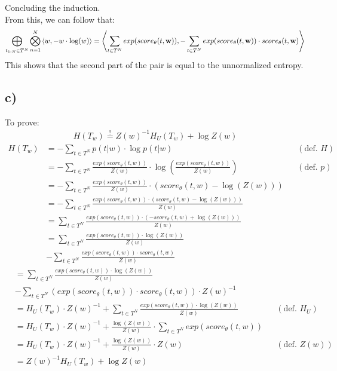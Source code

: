 \documentclass[a4paper,12pt]{ETHexercise}
\begin{document}
Concluding the induction.\\
From this, we can follow that:
\begin{align*}
    \bigoplus_{t_{1:N} \in T^N} \bigotimes_{n=1}^N \left\langle w, -w \cdot \log(w)\right\rangle = \left\langle\sum_{t \in T^N} exp(score_\theta(t,\textbf{w})), -\sum_{t \in T^N} exp(score_\theta(t,\textbf{w})) \cdot score_\theta(t,\textbf{w})\right\rangle
\end{align*}
This shows that the second part of the pair is equal to the unnormalized entropy. 
\subsection*{c)}
To prove:
\begin{align}
    H(T_w) \stackrel{!}{=} Z(w)^{-1}H_{U}(T_w)+\log Z(w)
\end{align}
\begin{align}
    H(T_w) &= - \sum_{t\in T^N}p(t|w) \cdot \log p(t|w) &&(\text{def. } H)\\
    &= - \sum_{t\in T^N}\frac{exp(score_\theta(t,w))}{Z(w)} \cdot \log(\frac{exp(score_\theta(t,w))}{Z(w)}) &&(\text{def. } p)\\
    &= - \sum_{t\in T^N}\frac{exp(score_\theta(t,w))}{Z(w)} \cdot (score_\theta(t,w) - \log(Z(w))) \\
    &= - \sum_{t\in T^N}\frac{exp(score_\theta(t,w))\cdot (score_\theta(t,w) - \log(Z(w)))}{Z(w)}\\
    &= \sum_{t\in T^N}\frac{exp(score_\theta(t,w))\cdot (-score_\theta(t,w) + \log(Z(w)))}{Z(w)}\\    
    &=\sum_{t\in T^N}\frac{exp(score_\theta(t,w))\cdot \log(Z(w))}{Z(w)} \\
    &- \sum_{t\in T^N}\frac{exp(score_\theta(t,w))\cdot score_\theta(t,w)}{Z(w)}
\end{align}
\begin{align}
    &= \sum_{t\in T^N}\frac{exp(score_\theta(t,w))\cdot \log(Z(w))}{Z(w)} \\
    &- \sum_{t\in T^N}(exp(score_\theta(t,w))\cdot score_\theta(t,w)) \cdot Z(w)^{-1}\\
    &= H_U(T_w) \cdot Z(w)^{-1} + \sum_{t\in T^N}\frac{exp(score_\theta(t,w))\cdot \log(Z(w))}{Z(w)} &&(\text{def. } H_U)\\
    &= H_U(T_w) \cdot Z(w)^{-1} + \frac{\log(Z(w))}{Z(w)} \cdot \sum_{t\in T^N}exp(score_\theta(t,w))\\
    &= H_U(T_w) \cdot Z(w)^{-1} + \frac{\log(Z(w))}{Z(w)} \cdot Z(w) &&(\text{def. } Z(w))\\
    &=  Z(w)^{-1}H_{U}(T_w)+\log Z(w)
\end{align}
\end{document}
